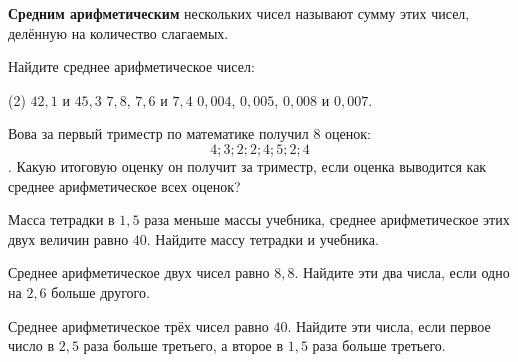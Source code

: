 \begin{consultation}
	\begin{definit}
		\textbf{Средним арифметическим} нескольких чисел называют сумму этих чисел, делённую на количество слагаемых.
	\end{definit}
	\begin{listofex}
		\item Найдите среднее арифметическое чисел:
		\begin{tasks}(2)
			\task \( 42,1 \) и \( 45,3 \)
			\task \( 7,8 \), \( 7,6 \) и \( 7,4 \)
			\task \( 0,004 \), \( 0,005 \), \( 0,008 \) и \( 0,007 \).
		\end{tasks}
		\item Вова за первый триместр по математике получил \( 8 \) оценок:
		\[4; 3; 2; 2; 4; 5; 2; 4\].
		Какую итоговую оценку он получит за триместр, если оценка выводится как среднее арифметическое всех оценок? 
		\item Масса тетрадки в \( 1,5 \) раза меньше массы учебника, среднее арифметическое этих двух величин равно \( 40 \). Найдите массу тетрадки и учебника.
		\item Среднее арифметическое двух чисел равно \( 8,8 \). Найдите эти два числа, если одно на \( 2,6 \) больше другого.
		\item Среднее арифметическое трёх чисел равно \( 40 \). Найдите эти числа, если первое число в \( 2,5 \) раза больше третьего, а второе в \( 1,5 \) раза больше третьего.
	\end{listofex}
\end{consultation}
